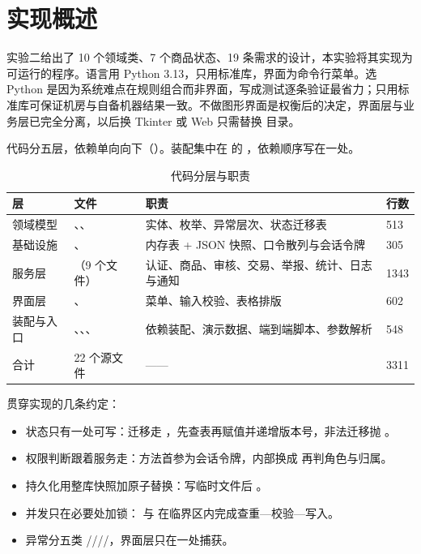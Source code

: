 \section{实现概述}

实验二给出了 10 个领域类、7 个商品状态、19 条需求的设计，本实验将其实现为可运行的程序。语言用 Python 3.13，只用标准库，界面为命令行菜单。选 Python 是因为系统难点在规则组合而非界面，写成测试逐条验证最省力；只用标准库可保证机房与自备机器结果一致。不做图形界面是权衡后的决定，界面层与业务层已完全分离，以后换 Tkinter 或 Web 只需替换  目录。

代码分五层，依赖单向向下（）。装配集中在  的 ，依赖顺序写在一处。

\begin{table}[htbp]
\centering
\caption{代码分层与职责}\label{tab:layer}
\renewcommand{\arraystretch}{1.18}
\begin{tabularx}{\textwidth}{@{}L{2.05cm}L{4.5cm}YL{1.35cm}@{}}
\toprule
层 & 文件 & 职责 & 行数 \\
\midrule
领域模型 & 、、 & 实体、枚举、异常层次、状态迁移表 & 513 \\
基础设施 & 、 & 内存表 + JSON 快照、口令散列与会话令牌 & 305 \\
服务层 & （9 个文件） & 认证、商品、审核、交易、举报、统计、日志与通知 & 1343 \\
界面层 & 、 & 菜单、输入校验、表格排版 & 602 \\
装配与入口 & 、、、 & 依赖装配、演示数据、端到端脚本、参数解析 & 548 \\
\midrule
合计 & 22 个源文件 & —— & 3311 \\
\bottomrule
\end{tabularx}
\end{table}

贯穿实现的几条约定：

\begin{itemize}[leftmargin=1.6em,itemsep=2pt,topsep=3pt]
\item 状态只有一处可写：迁移走 ，先查表再赋值并递增版本号，非法迁移抛 。
\item 权限判断跟着服务走：方法首参为会话令牌，内部换成  再判角色与归属。
\item 持久化用整库快照加原子替换：写临时文件后 。
\item 并发只在必要处加锁： 与  在临界区内完成查重—校验—写入。
\item 异常分五类 ////，界面层只在一处捕获。
\end{itemize}
